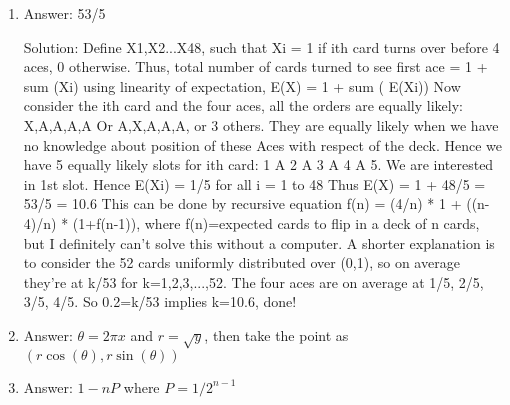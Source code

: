\begin{enumerate}

\item
Answer: 53/5
 
Solution: Define X1,X2...X48, such that Xi = 1 if ith card turns over before 4 aces, 0 otherwise. Thus, total number of cards turned to see first ace = 1 + sum (Xi)
using linearity of expectation, E(X) = 1 + sum ( E(Xi))
Now consider the ith card and the four aces, all the orders are equally likely: X,A,A,A,A Or A,X,A,A,A, or 3 others. They are equally likely when we have no knowledge about position of these Aces with respect of the deck. Hence we have 5 equally likely slots for ith card: 1 A 2 A 3 A 4 A 5. We are interested in 1st slot.
Hence E(Xi) = 1/5 for all i = 1 to 48
Thus E(X) = 1 + 48/5 = 53/5 = 10.6
This can be done by recursive equation  f(n) = (4/n) * 1 + ((n-4)/n) * (1+f(n-1)), where f(n)=expected cards to flip in a deck of n cards, but I definitely can't solve this without a computer.
A shorter explanation is to consider the 52 cards uniformly distributed over (0,1), so on average they're at k/53 for k=1,2,3,...,52. The four aces are on average at 1/5, 2/5, 3/5, 4/5. So 0.2=k/53 implies k=10.6, done!




\item
Answer: $\theta = 2 \pi x$ and $r = \sqrt{y}$, then take the point as $(r \cos(\theta),r \sin(\theta))$




\item
Answer: $1- nP$ where $P = 1/{2^{n-1}}$
 

\end{enumerate}
